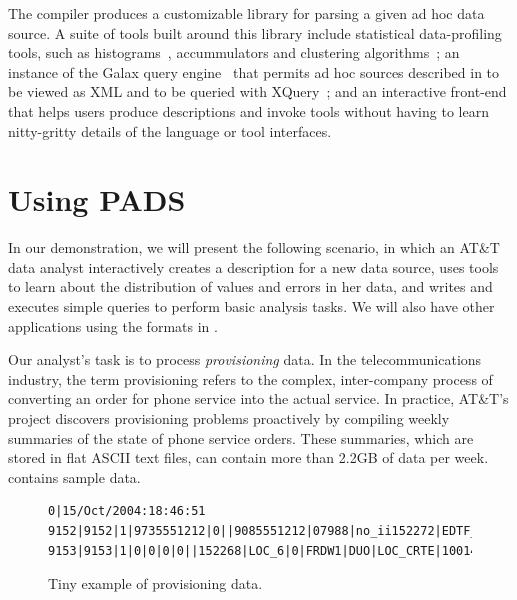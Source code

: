 The \pads{} compiler produces a customizable library for parsing a
given ad hoc data source.  A suite of tools built around this library
include statistical data-profiling tools, such as histograms~\cite{xx},
accummulators and clustering algorithms~\cite{yy}; an instance of the Galax
query engine~\cite{galaxmanual} that permits ad hoc sources described
in \pads{} to be viewed as XML and to be queried with
XQuery~\cite{fernandez+:padx}; and an interactive front-end that helps
users produce \pads{} descriptions and invoke tools without having to
learn nitty-gritty details of the \pads{} language or tool interfaces.

\section{Using PADS}
\label{subsec:example}

In our demonstration, we will present the following scenario, in which
an AT\&T data analyst interactively creates a \pads{} description for
a new data source, uses \pads{} tools to learn about the distribution
of values and errors in her data, and writes and executes simple
queries to perform basic analysis tasks.  We will also have other
\pads{} applications using the formats in .

Our analyst's task is to process \textit{provisioning} data.  In the
telecommunications industry, the term {provisioning} refers to
the complex, inter-company process of converting an order for phone
service into the actual service.  In practice, AT\&T's \dibbler{}
project discovers provisioning problems proactively by compiling
weekly summaries of the state of phone service
orders.  These summaries, which are stored in flat ASCII text files,
can contain more than 2.2GB of data per
week.  contains sample \dibbler{} data.
\begin{figure}
\begin{small}
\begin{center}
\begin{verbatim}
0|15/Oct/2004:18:46:51
9152|9152|1|9735551212|0||9085551212|07988|no_ii152272|EDTF_6|0|APRL1|DUO|10|16/Oct/2004:10:02:10
9153|9153|1|0|0|0|0||152268|LOC_6|0|FRDW1|DUO|LOC_CRTE|1001476800|LOC_OS_10|17/Oct/2004:08:14:21
\end{verbatim}
\caption{Tiny example of \dibbler{} provisioning data.}
\label{figure:dibbler-records}
\end{center}
\end{small}
\end{figure}

